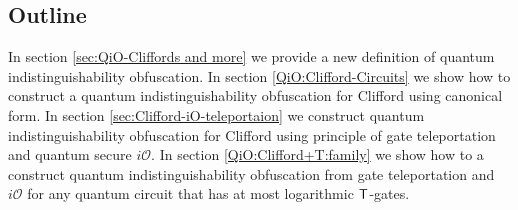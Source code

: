 \subsection*{Outline}
In section \ref{sec:QiO-Cliffords and more} we provide a new definition of quantum indistinguishability obfuscation. In section \ref{QiO:Clifford-Circuits} we show how to construct a quantum indistinguishability obfuscation for Clifford using canonical form. In section \ref{sec:Clifford-iO-teleportaion} we construct quantum indistinguishability obfuscation for Clifford using principle of gate teleportation and quantum secure $i\mathcal{O}.$ In section \ref{QiO:Clifford+T:family} we show how to a construct quantum indistinguishability obfuscation from gate teleportation and $i\mathcal{O}$ for any quantum circuit that has at most logarithmic ${\sf T}$-gates.

